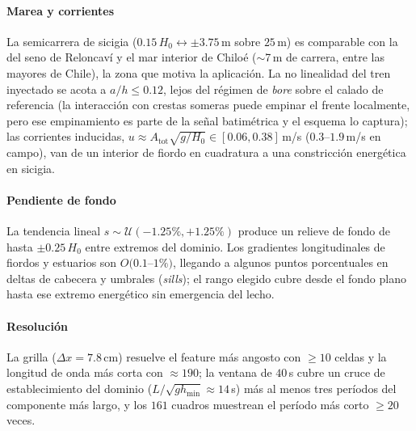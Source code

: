 \documentclass[conference]{IEEEtran}
\begin{document}
\paragraph{Marea y corrientes}
La semicarrera de sicigia ($0.15\,H_0 \leftrightarrow \pm3.75$\,m sobre
$25$\,m) es comparable con la del seno de Reloncaví y el mar interior de Chiloé
($\sim$7\,m de carrera, entre las mayores de Chile), la zona que motiva la
aplicación. La no linealidad del tren inyectado se acota a $a/h\le0.12$, lejos
del régimen de \emph{bore} sobre el calado de referencia (la interacción con
crestas someras puede empinar el frente localmente, pero ese empinamiento es
parte de la señal batimétrica y el esquema lo captura); las corrientes
inducidas,
$u\approx A_{\text{tot}}\sqrt{g/H_0}\in[0.06,0.38]$\,m/s ($0.3$--$1.9$\,m/s en
campo), van de un interior de fiordo en cuadratura a una constricción
energética en sicigia.

\paragraph{Pendiente de fondo}
La tendencia lineal $s\sim\mathcal{U}(-1.25\%,+1.25\%)$ produce un relieve de
fondo de hasta $\pm0.25\,H_0$ entre extremos del dominio. Los gradientes
longitudinales de fiordos y estuarios son $O(0.1$--$1\%)$, llegando a algunos
puntos porcentuales en deltas de cabecera y umbrales (\emph{sills}); el rango
elegido cubre desde el fondo plano hasta ese extremo energético sin emergencia
del lecho.

\paragraph{Resolución}
La grilla ($\Delta x=7.8$\,cm) resuelve el feature más angosto con $\ge 10$
celdas y la longitud de onda más corta con $\approx 190$; la ventana de
$40$\,s cubre un cruce de establecimiento del dominio
($L/\sqrt{gh_{\min}}\approx14$\,s) más al menos tres períodos del componente
más largo, y los $161$ cuadros muestrean el período más corto $\ge 20$ veces.
\end{document}
